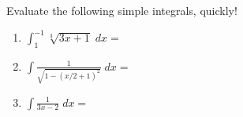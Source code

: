 \documentclass[../main.tex]{subfiles}
\begin{document}
  \begin{example}
    Evaluate the following simple integrals, quickly!

    \begin{enumerate}[wide]
      \item \(\int_{1}^{-1} \sqrt[3]{3x + 1} \;dx = \)
      \item \(\int \frac{1}{\sqrt{1 - (x/2 + 1)^2}} \;dx = \)
      \item \(\int \frac{1}{3x-2} \;dx = \)
    \end{enumerate}
  \end{example}
\end{document}
